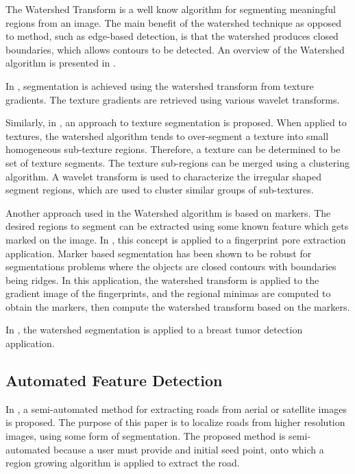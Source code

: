 The Watershed Transform is a well know algorithm for segmenting meaningful regions from an image. The main benefit of the watershed technique as opposed to method, such as edge-based detection, is that the watershed produces closed boundaries, which allows contours to be detected. An overview of the Watershed algorithm	is presented in \cite{Watershed-transform-definition-algorithms-parallelization-strategies}.

In \cite{Image_segmentation_using_texture_gradient_based_watershed_transform}, segmentation is achieved using the watershed transform from texture gradients. The texture gradients are retrieved using various wavelet transforms.

Similarly, in \cite{Watershed-based-textural-image-segmentation}, an approach to texture segmentation is proposed. When applied to textures,	the watershed algorithm tends to over-segment a texture into small homogeneous sub-texture regions. Therefore, a texture can be determined	to be set of texture segments. The texture sub-regions can be merged using a clustering algorithm. A wavelet transform is used to characterize the irregular shaped segment regions, which are used to cluster similar	groups of sub-textures.

Another approach used in the Watershed algorithm is based on markers. The desired regions to segment can be extracted	using some known feature which gets marked on the image. In \cite{Fingerprint-pore-extraction-based-marker-controlled-watershed-segmentation}, this concept is applied to a fingerprint pore extraction application. Marker based segmentation has been shown to be robust for segmentations problems where the objects are closed contours with boundaries being ridges. In this application, the watershed transform is applied to the gradient image of the fingerprints, and the regional minimas are computed to obtain the markers, then compute the watershed transform based on the markers.

In \cite{Detection-breast-tumor-candidates-using-marker-controlled-watershed-segmentation}, the watershed segmentation is applied to a breast tumor detection application.


\subsection{Automated Feature Detection}

In \cite{Extraction_roads_multispectral_imagery}, a semi-automated method for extracting roads from aerial or satellite images is proposed. The purpose of this paper is to localize roads from higher resolution images, using some form of segmentation. The proposed method is semi-automated because a user must provide and initial seed point, onto which a region growing algorithm is applied to extract the road.

